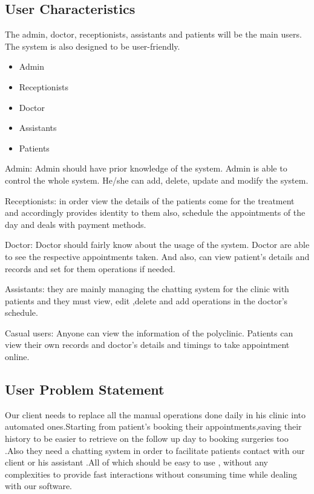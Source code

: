 \documentclass[]{article}
\begin{document}
\subsection{ User Characteristics}
The admin, doctor, receptionists, assistants and patients will be the main users. The system is also designed to be user-friendly. 

\begin{itemize}
  \item Admin
  \item Receptionists
  \item Doctor
  \item Assistants
  \item Patients
  
  
\end{itemize}

Admin: Admin should have prior knowledge of the system. Admin is able to control the whole system. He/she can add, delete, update and modify the system.


Receptionists: in order view the details of the patients come for the treatment and accordingly provides identity to them also, schedule the appointments of the day and deals with payment methods. 


Doctor: Doctor should fairly know about the usage of the system. Doctor are able to see the respective appointments taken. And also, can view patient’s details and records and set for them operations if needed.


Assistants: they are mainly managing the chatting system for the clinic with patients and they must  view, edit ,delete and add operations in the doctor’s schedule.


Casual users: Anyone can view the information of the polyclinic. Patients can view their own records and doctor’s details and timings to take appointment online.


\subsection{ User Problem Statement}
Our client needs to replace all the manual operations done daily in his clinic into automated ones.Starting from patient's booking their appointments,saving their history to be easier to retrieve on the follow up day to booking surgeries too .Also they need a chatting system in order to facilitate patients contact with our client or his assistant .All of which should be easy to use , without any complexities to provide fast interactions without consuming time while dealing with our software.
\end{document}
